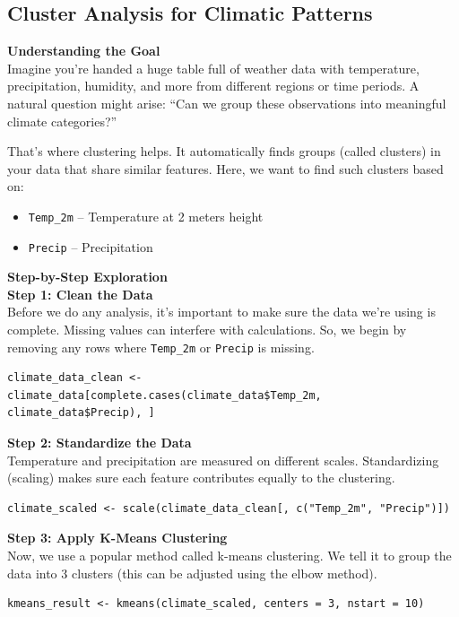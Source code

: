 \subsection*{Cluster Analysis for Climatic Patterns}

\textbf{Understanding the Goal}\\

Imagine you’re handed a huge table full of weather data with temperature, precipitation, humidity, and more from different regions or time periods. A natural question might arise: “Can we group these observations into meaningful climate categories?”

That’s where clustering helps. It automatically finds groups (called clusters) in your data that share similar features. Here, we want to find such clusters based on:
\begin{itemize}
    \item \texttt{Temp\_2m} – Temperature at 2 meters height
    \item \texttt{Precip} – Precipitation
\end{itemize}

\textbf{Step-by-Step Exploration}\\

\textbf{Step 1: Clean the Data} \\
Before we do any analysis, it’s important to make sure the data we’re using is complete. Missing values can interfere with calculations. So, we begin by removing any rows where \texttt{Temp\_2m} or \texttt{Precip} is missing.
\begin{verbatim}
climate_data_clean <- climate_data[complete.cases(climate_data$Temp_2m,
climate_data$Precip), ]
\end{verbatim}

\textbf{Step 2: Standardize the Data} \\
Temperature and precipitation are measured on different scales. Standardizing (scaling) makes sure each feature contributes equally to the clustering.
\begin{verbatim}
climate_scaled <- scale(climate_data_clean[, c("Temp_2m", "Precip")])
\end{verbatim}

\textbf{Step 3: Apply K-Means Clustering} \\
Now, we use a popular method called k-means clustering. We tell it to group the data into 3 clusters (this can be adjusted using the elbow method).
\begin{verbatim}
kmeans_result <- kmeans(climate_scaled, centers = 3, nstart = 10)
\end{verbatim}

